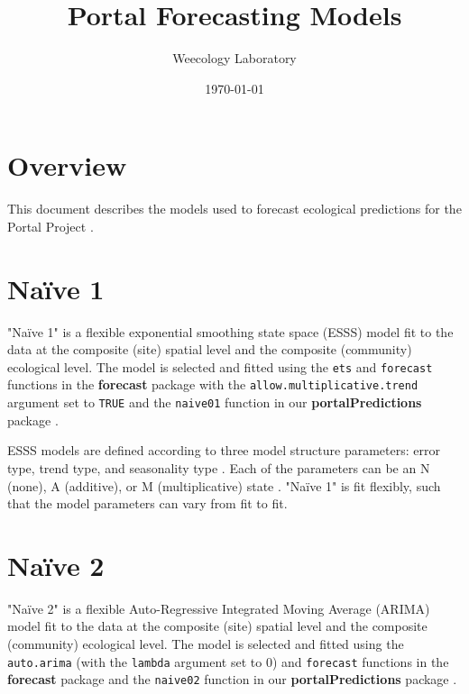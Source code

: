 \documentclass{article}
\title{Portal Forecasting Models}
\author[1]{Weecology Laboratory}
\affil[1]{University of Florida}
\date{\today}
\def\code#1{\texttt{#1}}
\begin{document}
\maketitle
\tableofcontents

\section*{Overview}
\label{sec:overview}

This document describes the models used to forecast ecological predictions for the Portal Project \cite{portal, portalpredictions}. 

\section{Na\"{i}ve 1}
\label{sec:naive01}

"Na\"{i}ve 1" is a flexible exponential smoothing state space (ESSS) model \cite{esssbook} fit to the data at the composite (site) spatial level and the composite (community) ecological level. The model is selected and fitted using the \code{ets} and \code{forecast} functions in the \textbf{forecast} package \cite{forecast} with the \code{allow.multiplicative.trend} argument set to \code{TRUE} and the \code{naive01} function in our \textbf{portalPredictions} package \cite{portalpredictions}.

ESSS models are defined according to three model structure parameters: error type, trend type, and seasonality type \cite{esssbook}. Each of the parameters can be an N (none), A (additive), or M (multiplicative) state \cite{esssbook}. "Na\"{i}ve 1" is fit flexibly, such that the model parameters can vary from fit to fit.

\section{Na\"{i}ve 2}
\label{sec:naive02}

"Na\"{i}ve 2" is a flexible Auto-Regressive Integrated Moving Average (ARIMA) model fit to the data at the composite (site) spatial level and the composite (community) ecological level. The model is selected and fitted using the \code{auto.arima} (with the \code{lambda} argument set to 0) and \code{forecast} functions in the \textbf{forecast} package \cite{forecast} \cite{forecastingbook} and the \code{naive02} function in our \textbf{portalPredictions} package \cite{portalpredictions}.
\end{document}
